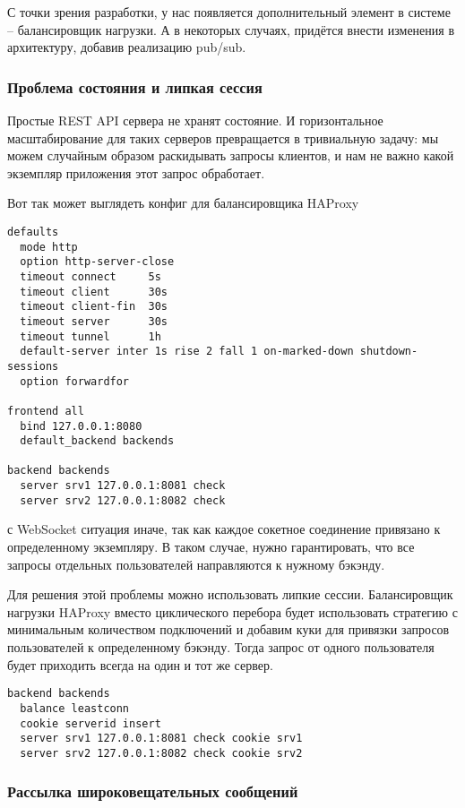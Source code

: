 С точки зрения разработки, у нас появляется дополнительный элемент в системе -- балансировщик нагрузки. А в некоторых случаях, придётся внести изменения в архитектуру, добавив реализацию pub/sub.

\subsubsection{Проблема состояния и липкая сессия}

Простые REST API сервера не хранят состояние. И горизонтальное масштабирование для таких серверов превращается в тривиальную задачу: мы можем случайным образом раскидывать запросы клиентов, и нам не важно какой экземпляр приложения этот запрос обработает.

Вот так может выглядеть конфиг для балансировщика HAProxy \cite{label5}

\begin{lstlisting}[style=CommandLineStyle]
defaults
  mode http
  option http-server-close
  timeout connect     5s
  timeout client      30s
  timeout client-fin  30s
  timeout server      30s
  timeout tunnel      1h
  default-server inter 1s rise 2 fall 1 on-marked-down shutdown-sessions
  option forwardfor

frontend all
  bind 127.0.0.1:8080
  default_backend backends

backend backends
  server srv1 127.0.0.1:8081 check
  server srv2 127.0.0.1:8082 check
\end{lstlisting}

с WebSocket ситуация иначе, так как каждое сокетное соединение привязано к определенному экземпляру. В таком случае, нужно гарантировать, что все запросы отдельных пользователей направляются к нужному бэкэнду. 

Для решения этой проблемы можно использовать липкие сессии. Балансировщик нагрузки HAProxy вместо циклического перебора будет использовать стратегию с минимальным количеством подключений и добавим куки для привязки запросов пользователей к определенному бэкэнду. Тогда запрос от одного пользователя будет приходить всегда на один и тот же сервер.

\begin{lstlisting}[style=CommandLineStyle]
backend backends
  balance leastconn
  cookie serverid insert
  server srv1 127.0.0.1:8081 check cookie srv1
  server srv2 127.0.0.1:8082 check cookie srv2
\end{lstlisting}

\subsubsection{Рассылка широковещательных сообщений}

